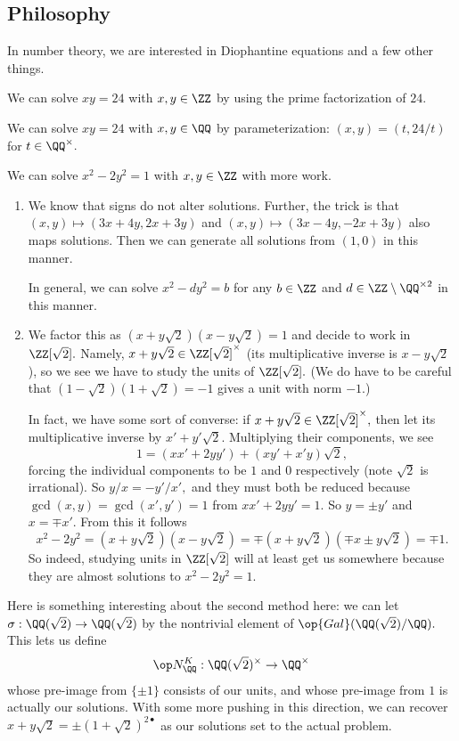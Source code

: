 \subsection{Philosophy}
In number theory, we are interested in Diophantine equations and a few other things.
\begin{ex}
    We can solve $xy=24$ with $x,y\in\ZZ$ by using the prime factorization of $24.$
\end{ex}
\begin{ex}
    We can solve $xy=24$ with $x,y\in\QQ$ by parameterization: $(x,y)=(t,24/t)$ for $t\in\QQ^\times.$
\end{ex}
\begin{ex}
    We can solve $x^2-2y^2=1$ with $x,y\in\ZZ$ with more work.
    \begin{enumerate}
        \item We know that signs do not alter solutions. Further, the trick is that $(x,y)\mapsto(3x+4y,2x+3y)$ and $(x,y)\mapsto(3x-4y,-2x+3y)$ also maps solutions. Then we can generate all solutions from $(1,0)$ in this manner.
        
        In general, we can solve $x^2-dy^2=b$ for any $b\in\ZZ$ and $d\in\ZZ\setminus\QQ^{\times2}$ in this manner.
        \item We factor this as $(x+y\sqrt2)(x-y\sqrt2)=1$ and decide to work in $\ZZ[\sqrt2].$ Namely, $x+y\sqrt2\in\ZZ[\sqrt2]^\times$ (its multiplicative inverse is $x-y\sqrt2$), so we see we have to study the units of $\ZZ[\sqrt2].$ (We do have to be careful that $(1-\sqrt2)(1+\sqrt2)=-1$ gives a unit with norm $-1.$)
        
        In fact, we have some sort of converse: if $x+y\sqrt2\in\ZZ[\sqrt2]^\times,$ then let its multiplicative inverse by $x'+y'\sqrt2.$ Multiplying their components, we see
        \[1=(xx'+2yy')+(xy'+x'y)\sqrt2,\]
        forcing the individual components to be $1$ and $0$ respectively (note $\sqrt2$ is irrational). So $y/x=-y'/x',$ and they must both be reduced because $\gcd(x,y)=\gcd(x',y')=1$ from $xx'+2yy'=1.$ So $y=\pm y'$ and $x=\mp x'.$ From this it follows
        \[x^2-2y^2=(x+y\sqrt2)(x-y\sqrt2)=\mp(x+y\sqrt2)(\mp x\pm y\sqrt2)=\mp1.\]
        So indeed, studying units in $\ZZ[\sqrt2]$ will at least get us somewhere because they are almost solutions to $x^2-2y^2=1.$
    \end{enumerate}
\end{ex}
Here is something interesting about the second method here: we can let $\sigma:\QQ(\sqrt2)\to\QQ(\sqrt2)$ by the nontrivial element of $\op{Gal}(\QQ(\sqrt2)/\QQ).$ This lets us define
\[\op N_\QQ^K:\QQ(\sqrt2)^\times\to\QQ^\times\]
whose pre-image from $\{\pm1\}$ consists of our units, and whose pre-image from $1$ is actually our solutions. With some more pushing in this direction, we can recover $x+y\sqrt2=\pm(1+\sqrt2)^{2\bullet}$ as our solutions set to the actual problem.